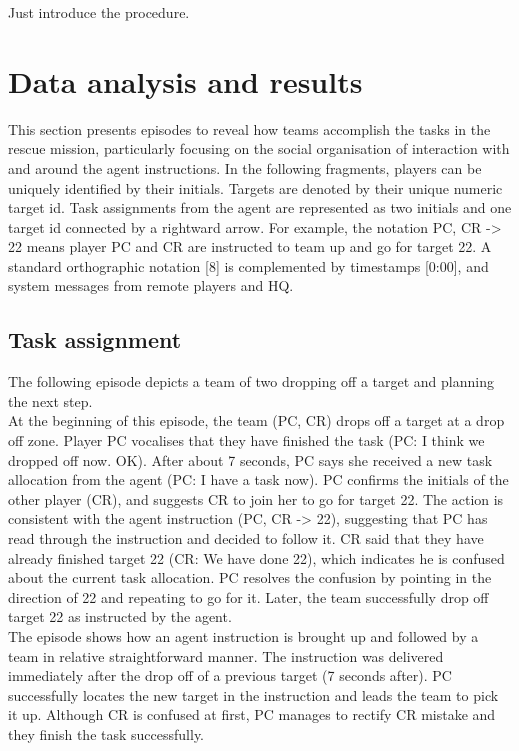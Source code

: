 Just introduce the procedure.\\

\section{Data analysis and results}

This section presents episodes to reveal how teams accomplish the tasks in the rescue mission, particularly focusing on the social organisation of interaction with and around the agent instructions. In the following fragments, players can be uniquely identified by their initials. Targets are denoted by their unique numeric target id. Task assignments from the agent are represented as two initials and one target id connected by a rightward arrow. For example, the notation PC, CR -> 22 means player PC and CR are instructed to team up and go for target 22. A standard orthographic notation [8] is complemented by timestamps [0:00], and system messages from remote players and HQ.  

\subsection{Task assignment}
The following episode depicts a team of two dropping off a target and planning the next step.\\

At the beginning of this episode, the team (PC, CR) drops off a target at a drop off zone. Player PC vocalises that they have finished the task (PC: I think we dropped off now. OK).  After about 7 seconds, PC says she received a new task allocation from the agent (PC: I have a task now). PC confirms the initials of the other player (CR), and suggests CR to join her to go for target 22. The action is consistent with the agent instruction (PC, CR -> 22), suggesting that PC has read through the instruction and decided to follow it. CR said that they have already finished target 22 (CR: We have done 22), which indicates he is confused about the current task allocation. PC resolves the confusion by pointing in the direction of 22 and repeating to go for it. Later, the team successfully drop off target 22 as instructed by the agent.\\

The episode shows how an agent instruction is brought up and followed by a team in relative straightforward manner. The instruction was delivered immediately after the drop off of a previous target (7 seconds after). PC successfully locates the new target in the instruction and leads the team to pick it up. Although CR is confused at first, PC manages to rectify CR mistake and they finish the task successfully. \\

